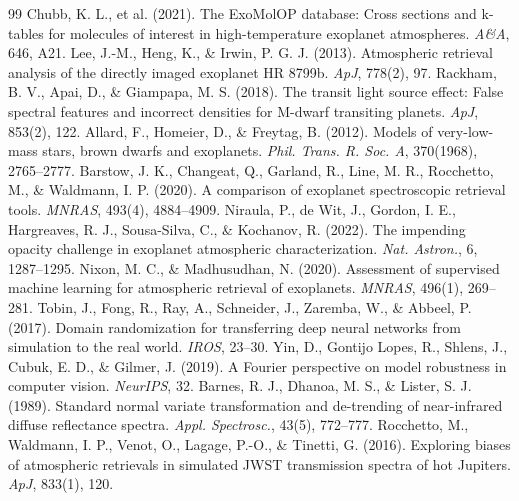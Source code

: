 \documentclass{article}
\begin{document}
\begin{thebibliography}{99}
 Chubb, K. L., et al. (2021). The ExoMolOP database: Cross sections and k-tables for molecules of interest in high-temperature exoplanet atmospheres. \emph{A\&A}, 646, A21.
 Lee, J.-M., Heng, K., \& Irwin, P. G. J. (2013). Atmospheric retrieval analysis of the directly imaged exoplanet HR 8799b. \emph{ApJ}, 778(2), 97.
 Rackham, B. V., Apai, D., \& Giampapa, M. S. (2018). The transit light source effect: False spectral features and incorrect densities for M-dwarf transiting planets. \emph{ApJ}, 853(2), 122.
 Allard, F., Homeier, D., \& Freytag, B. (2012). Models of very-low-mass stars, brown dwarfs and exoplanets. \emph{Phil. Trans. R. Soc. A}, 370(1968), 2765--2777.
 Barstow, J. K., Changeat, Q., Garland, R., Line, M. R., Rocchetto, M., \& Waldmann, I. P. (2020). A comparison of exoplanet spectroscopic retrieval tools. \emph{MNRAS}, 493(4), 4884--4909.
 Niraula, P., de Wit, J., Gordon, I. E., Hargreaves, R. J., Sousa-Silva, C., \& Kochanov, R. (2022). The impending opacity challenge in exoplanet atmospheric characterization. \emph{Nat. Astron.}, 6, 1287--1295.
 Nixon, M. C., \& Madhusudhan, N. (2020). Assessment of supervised machine learning for atmospheric retrieval of exoplanets. \emph{MNRAS}, 496(1), 269--281.
 Tobin, J., Fong, R., Ray, A., Schneider, J., Zaremba, W., \& Abbeel, P. (2017). Domain randomization for transferring deep neural networks from simulation to the real world. \emph{IROS}, 23--30.
 Yin, D., Gontijo Lopes, R., Shlens, J., Cubuk, E. D., \& Gilmer, J. (2019). A Fourier perspective on model robustness in computer vision. \emph{NeurIPS}, 32.
 Barnes, R. J., Dhanoa, M. S., \& Lister, S. J. (1989). Standard normal variate transformation and de-trending of near-infrared diffuse reflectance spectra. \emph{Appl. Spectrosc.}, 43(5), 772--777.
 Rocchetto, M., Waldmann, I. P., Venot, O., Lagage, P.-O., \& Tinetti, G. (2016). Exploring biases of atmospheric retrievals in simulated JWST transmission spectra of hot Jupiters. \emph{ApJ}, 833(1), 120.
\end{thebibliography}
\end{document}
